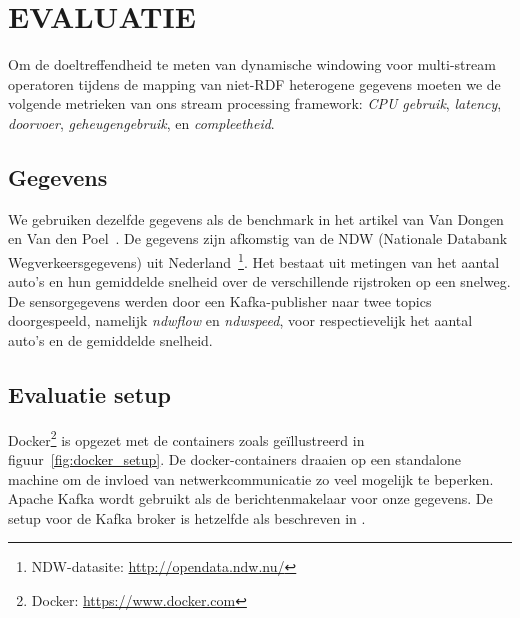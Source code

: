 \section{EVALUATIE}
\label{chap:Evaluation}

Om de doeltreffendheid te meten van dynamische windowing voor multi-stream operatoren tijdens de 
mapping van niet-RDF heterogene gegevens moeten we de volgende 
metrieken van ons stream processing framework: \emph{CPU gebruik}, \emph{latency}, \emph{doorvoer},
\emph{geheugengebruik}, en \emph{compleetheid}. 

\subsection{Gegevens}
We gebruiken dezelfde gegevens 
als de benchmark in het artikel van Van Dongen en Van den Poel~\cite{evalution_of_spe}. 
De gegevens zijn afkomstig van de NDW (Nationale Databank Wegverkeersgegevens) uit 
Nederland~\footnote{NDW-datasite: \href{http://opendata.ndw.nu/}{http://opendata.ndw.nu/} }.
Het bestaat uit metingen van het aantal auto's en hun gemiddelde snelheid over de verschillende 
rijstroken op een snelweg. 
De sensorgegevens werden door een Kafka-publisher naar twee topics doorgespeeld, namelijk 
\emph{ndwflow} en \emph{ndwspeed}, voor respectievelijk het aantal auto's en de gemiddelde snelheid.

\subsection{Evaluatie setup}

Docker\footnote{Docker: \url{https://www.docker.com}} is 
opgezet met de containers 
zoals ge\"illustreerd in figuur~\ref{fig:docker_setup}. De docker-containers 
draaien op een standalone machine om de invloed van 
netwerkcommunicatie zo veel mogelijk te beperken. Apache Kafka wordt gebruikt 
als de berichtenmakelaar voor onze gegevens. De setup voor de Kafka broker is 
hetzelfde als beschreven in \cite{evalution_of_spe}. 



